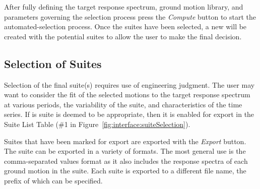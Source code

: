 \documentclass[11pt]{article}
\begin{document}
After fully defining the target response spectrum, ground motion library, and
parameters governing the selection process press the \emph{Compute} button to
start the automated-selection process. Once the suites have been selected, a new
will be created with the potential suites to allow the user to make the final
decision.

\subsection{Selection of Suites}

Selection of the final suite(s) requires use of engineering judgment. The user
may want to consider the fit of the selected motions to the target response
spectrum at various periods, the variability of the suite, and characteristics
of the time series. If is suite is deemed to be appropriate, then it is enabled
for export in the Suite List Table (\#1 in
Figure~\ref{fig:interface:suiteSelection}).

Suites that have been marked for export are exported with the \emph{Export}
button. The suite can be exported in a variety of formats. The most general use
is the comma-separated values format as it also includes the response spectra of
each ground motion in the suite. Each suite is exported to a different file
name, the prefix of which can be specified.


\end{document}
